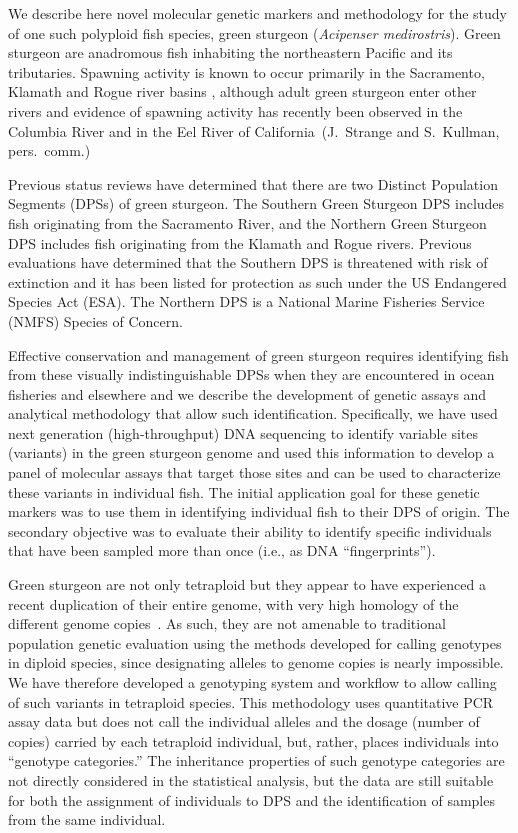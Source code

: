 \documentclass[twocolumn,natbib]{svjour3}       %
\begin{document}
We describe here novel molecular genetic markers and methodology for the study
of 
one such polyploid fish species, green sturgeon ({\em Acipenser medirostris}). Green sturgeon are anadromous fish
inhabiting the northeastern Pacific and its tributaries. Spawning activity is
known to occur primarily in the Sacramento, Klamath and Rogue river basins
\citep{adams2007population}, although adult green sturgeon enter other rivers and evidence of
spawning activity has recently been observed in the Columbia River \citep{schreier2016further} and
in the Eel River of California~(J.~Strange and S.~Kullman, pers.\ comm.)

Previous status reviews \citep{adams2007population,nmfs2015sturgeon} have determined that
there are two Distinct Population Segments (DPSs) of green sturgeon. The
Southern Green Sturgeon DPS includes fish originating from the Sacramento River,
and the Northern Green Sturgeon DPS includes fish originating from the Klamath
and Rogue rivers. Previous evaluations \citep{adams2007population,nmfs2015sturgeon} have
determined that the Southern DPS is threatened with risk of extinction and it
has been listed for protection as such under the US Endangered Species Act (ESA). The
Northern DPS is a National Marine Fisheries Service (NMFS) Species of Concern.

Effective conservation and management of green sturgeon requires identifying 
fish from these visually indistinguishable DPSs when they are encountered in 
ocean fisheries and elsewhere and we describe the development of genetic 
assays and analytical methodology that allow such identification. Specifically, 
we have used next generation (high-throughput)
DNA sequencing to identify variable sites (variants) in the green sturgeon
genome and used this information to develop a panel of molecular assays that
target those sites and can be used to characterize these variants in
individual fish. The initial application goal for these genetic markers was to
use them in identifying individual fish to their DPS of origin. The
secondary objective was to evaluate their ability to identify specific
individuals that have been sampled more than once (i.e., as DNA ``fingerprints'').

Green sturgeon are not only tetraploid but they appear to have experienced a 
recent duplication of their entire genome, with very high homology of 
the different genome copies~\citep{Israeletal2009}. As such, they are not amenable to traditional
population genetic evaluation using the methods developed for calling genotypes
in diploid species, since designating alleles to genome 
copies is nearly impossible. 
We have therefore developed a genotyping system and workflow to allow 
calling of such variants in tetraploid species. 
This methodology uses quantitative PCR assay data 
but does not call the individual alleles and the dosage 
(number of copies) carried by each tetraploid individual, but, rather, 
places individuals into ``genotype categories.''  The
inheritance properties of such genotype categories are not directly considered
in the statistical analysis, but the data are still suitable for both the assignment
of individuals to DPS and the identification of samples from the same
individual.
\end{document}
